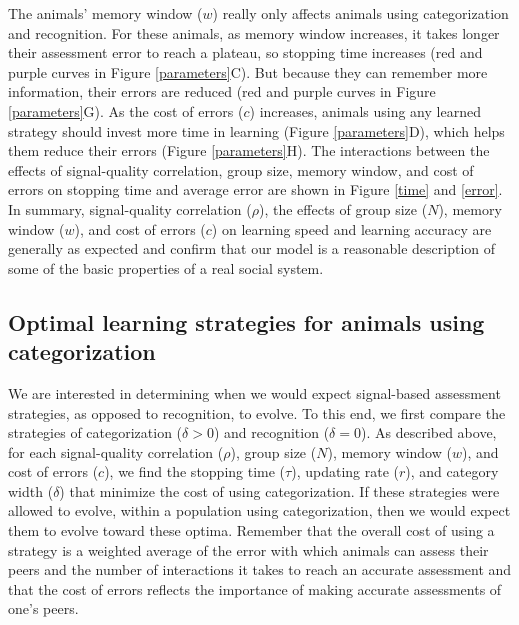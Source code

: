 The animals' memory window ($w$) really only affects animals using categorization and recognition. For these animals, as memory window increases, it takes longer their assessment error to reach a plateau, so stopping time increases (red and purple curves in Figure \ref{parameters}C). But because they can remember more information, their errors are reduced (red and purple curves in Figure \ref{parameters}G). As the cost of errors ($c$) increases, animals using any learned strategy should invest more time in learning (Figure \ref{parameters}D), which helps them reduce their errors (Figure \ref{parameters}H). The interactions between the effects of signal-quality correlation, group size, memory window, and cost of errors on stopping time and average error are shown in Figure \ref{time} and \ref{error}. In summary, signal-quality correlation ($\rho$), the effects of group size ($N$), memory window ($w$), and cost of errors ($c$) on learning speed and learning accuracy are generally as expected and confirm that our model is a reasonable description of some of the basic properties of a real social system. 
  
\subsection*{Optimal learning strategies for animals using categorization}
We are interested in determining when we would expect signal-based assessment strategies, as opposed to recognition, to evolve. To this end, we first compare the strategies of categorization ($\delta>0$) and recognition ($\delta=0$). As described above, for each signal-quality correlation ($\rho$), group size ($N$), memory window ($w$), and cost of errors ($c$), we find the stopping time ($\tau$), updating rate ($r$), and category width ($\delta$) that minimize the cost of using categorization. If these strategies were allowed to evolve, within a population using categorization, then we would expect them to evolve toward these optima. Remember that the overall cost of using a strategy is a weighted average of the error with which animals can assess their peers and the number of interactions it takes to reach an accurate assessment and that the cost of errors reflects the importance of making accurate assessments of one's peers. 

